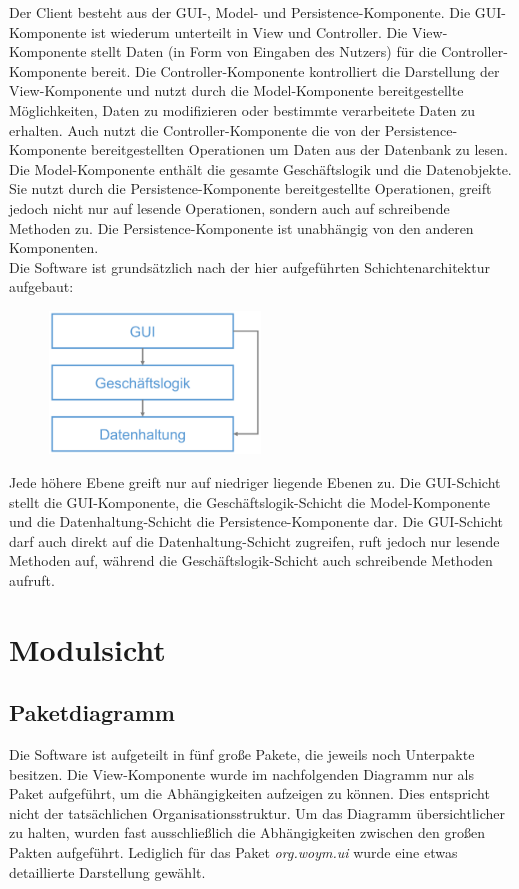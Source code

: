 \documentclass[fontsize=12pt,paper=a4,twoside]{scrartcl}
\begin{document}
Der Client besteht aus der GUI-, Model- und Persistence-Komponente. Die GUI-Komponente ist wiederum unterteilt in View und Controller. Die View-Komponente stellt Daten (in Form von Eingaben des Nutzers) für die Controller-Komponente bereit. Die Controller-Komponente kontrolliert die Darstellung der View-Komponente und nutzt durch die Model-Komponente bereitgestellte Möglichkeiten, Daten zu modifizieren oder bestimmte verarbeitete Daten zu erhalten. Auch nutzt die Controller-Komponente die von der Persistence-Komponente bereitgestellten Operationen um Daten aus der Datenbank zu lesen. Die Model-Komponente enthält die gesamte Geschäftslogik und die Datenobjekte. Sie nutzt durch die Persistence-Komponente bereitgestellte Operationen, greift jedoch nicht nur auf lesende Operationen, sondern auch auf schreibende Methoden zu. Die Persistence-Komponente ist unabhängig von den anderen Komponenten.\\

Die Software ist grundsätzlich nach der hier aufgeführten Schichtenarchitektur aufgebaut:

\begin{figure}[H]
\centering
\includegraphics[width=0.5\textwidth]{schichten.pdf}
\end{figure}

Jede höhere Ebene greift nur auf niedriger liegende Ebenen zu. Die GUI-Schicht stellt die GUI-Komponente, die Geschäftslogik-Schicht die Model-Komponente und die Datenhaltung-Schicht die Persistence-Komponente dar. Die GUI-Schicht darf auch direkt auf die Datenhaltung-Schicht zugreifen, ruft jedoch nur lesende Methoden auf, während die Geschäftslogik-Schicht auch schreibende Methoden aufruft.


\section{Modulsicht}
\label{sec:modulsicht}

\subsection{Paketdiagramm}
Die Software ist aufgeteilt in fünf große Pakete, die jeweils noch Unterpakte besitzen. Die View-Komponente wurde im nachfolgenden Diagramm nur als Paket aufgeführt, um die Abhängigkeiten aufzeigen zu können. Dies entspricht nicht der tatsächlichen Organisationsstruktur. Um das Diagramm übersichtlicher zu halten, wurden fast ausschließlich die Abhängigkeiten zwischen den großen Pakten aufgeführt. Lediglich für das Paket \textit{org.woym.ui} wurde eine etwas detaillierte Darstellung gewählt.
\end{document}
